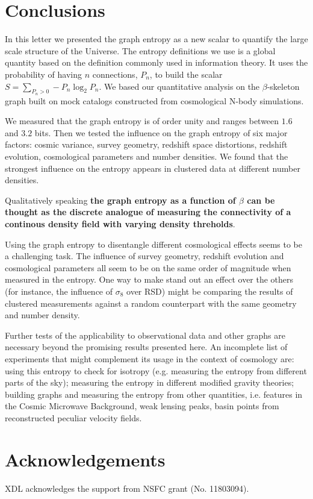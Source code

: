 \documentclass[fleqn,usenatbib]{mnras}
\begin{document}
\section{Conclusions}

In this letter we presented the graph entropy as a new scalar to 
quantify the large scale structure of the Universe.
The entropy definitions we use is a global quantity based on 
the definition commonly used in information theory.
It uses the probability of having $n$ connections, $P_n$, to build the 
scalar $S=\sum_{P_n>0} -P_n  \log_2 P_n$. 
We based our quantitative analysis on the $\beta$-skeleton graph 
built on mock catalogs constructed from cosmological N-body simulations.

We measured that the graph entropy is of order unity and ranges 
between $1.6$ and $3.2$ bits.
Then we tested the influence on the graph entropy of six major factors: 
cosmic variance, survey geometry, redshift space distortions, redshift evolution, cosmological parameters and number densities.
We found that the strongest influence on the entropy appears in
clustered data at different number  densities.

Qualitatively speaking \textbf{the graph entropy as a
  function of $\beta$ can be thought as the discrete analogue
  of measuring the connectivity of a continous density field with
  varying density threholds}. 

Using the graph entropy to disentangle different cosmological effects
seems to be a challenging task. 
The influence of survey geometry, redshift evolution and cosmological parameters 
all seem to be on the same order of magnitude when measured in the entropy.
One way to make stand out an effect over the others (for instance, the influence of
$\sigma_8$ over RSD) might be comparing the results of clustered measurements against
a random counterpart with the same geometry and number density.

Further tests of the applicability to observational data and other graphs 
are necessary beyond the  promising results presented here.
An incomplete list of experiments that might complement its usage in the context of
cosmology are: using this entropy to check for isotropy (e.g. measuring the entropy from
different parts of the sky); measuring the entropy in different modified gravity theories;
building graphs and measuring the entropy from 
other quantities, i.e. features in the Cosmic Microwave Background, weak lensing peaks,
basin points from reconstructed peculiar velocity fields.

\section*{Acknowledgements}
XDL acknowledges the support from NSFC grant (No. 11803094).




\end{document}
